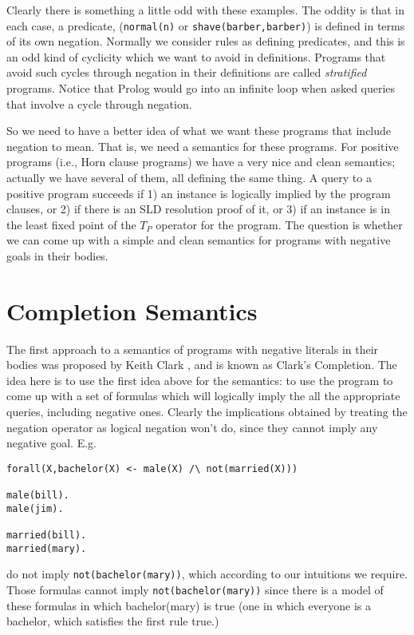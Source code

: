 Clearly there is something a little odd with these examples.  The
oddity is that in each case, a predicate, (\verb|normal(n)| or
\verb|shave(barber,barber)|) is defined in terms of its own negation.
Normally we consider rules as defining predicates, and this is an odd
kind of cyclicity which we want to avoid in definitions.  Programs
that avoid such cycles through negation in their definitions are
called {\em stratified} programs.  Notice that Prolog would go into an
infinite loop when asked queries that involve a cycle through
negation.

So we need to have a better idea of what we want these programs that
include negation to mean.  That is, we need a semantics for these
programs.  For positive programs (i.e., Horn clause programs) we have
a very nice and clean semantics; actually we have several of them, all
defining the same thing.  A query to a positive program succeeds if 1)
an instance is logically implied by the program clauses, or 2) if
there is an SLD resolution proof of it, or 3) if an instance is in the
least fixed point of the $T_P$ operator for the program.  The question
is whether we can come up with a simple and clean semantics for
programs with negative goals in their bodies.

\section{Completion Semantics}

The first approach to a semantics of programs with negative literals
in their bodies was proposed by Keith Clark \cite{}, and is known as
Clark's Completion.  The idea here is to use the first idea above for
the semantics: to use the program to come up with a set of formulas
which will logically imply the all the appropriate queries, including
negative ones.  Clearly the implications obtained by treating the
negation operator as logical negation won't do, since they cannot
imply any negative goal.  E.g.
\begin{verbatim}
forall(X,bachelor(X) <- male(X) /\ not(married(X)))

male(bill).
male(jim).

married(bill).
married(mary).
\end{verbatim}
do not imply \verb|not(bachelor(mary))|, which according to our
intuitions we require.  Those formulas cannot imply
\verb|not(bachelor(mary))| since there is a model of these formulas in
which bachelor(mary) is true (one in which everyone is a bachelor,
which satisfies the first rule true.)


